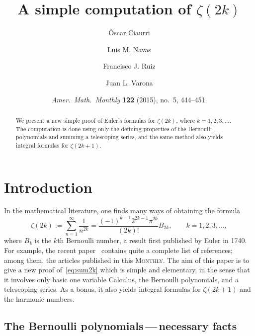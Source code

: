 \documentclass[10pt,reqno]{amsart}
\title{A simple computation of $\zeta(2k)$}
\author[\'O.~Ciaurri]{\'Oscar Ciaurri}
\author[L.~M.~Navas]{Luis M. Navas}
\author[F.~J.~Ruiz]{Francisco J. Ruiz}
\author[J.~L.~Varona]{Juan L. Varona}
\date{\textit{Amer.\ Math.\ Monthly} \textbf{122} (2015), no.~5, 444--451.}
\theoremstyle{remark}
\begin{document}


\begin{abstract}
We present a new simple proof of Euler's formulas for $\zeta(2k)$, where $k = 1,2,3,\dots$. 
The computation is done using only the defining properties of the Bernoulli polynomials 
and summing a telescoping series, and the same method also yields integral formulas 
for $\zeta(2k+1)$.
\end{abstract}

\maketitle

\section{Introduction}


In the mathematical literature, one finds many ways of obtaining the formula
%
\begin{equation}
\label{eq:sum2k}
  \zeta(2k) := \sum_{n=1}^{\infty} \frac{1}{n^{2k}}
             = \frac{(-1)^{k-1}2^{2k-1}\pi^{2k}}{(2k)!} B_{2k},
             \qquad k = 1,2,3,\dots,
\end{equation}
%
where $B_k$ is the $k$th Bernoulli number, a result first published by Euler in 1740. For example, the recent paper~\cite{AmoDF} contains quite a complete list of references; among them, the articles \cite{Apo-MO, Os-MO, Ts-MO, Wi-MO} published in this \textsc{Monthly}.
The aim of this paper is to give a new proof of~\eqref{eq:sum2k} which is simple and elementary, in the sense that it involves only basic one variable Calculus, the Bernoulli polynomials, and a telescoping series. As a bonus, it also yields integral formulas for $\zeta(2k+1)$ and the harmonic numbers.

\subsection{The Bernoulli polynomials\,---\,necessary facts}
\end{document}
